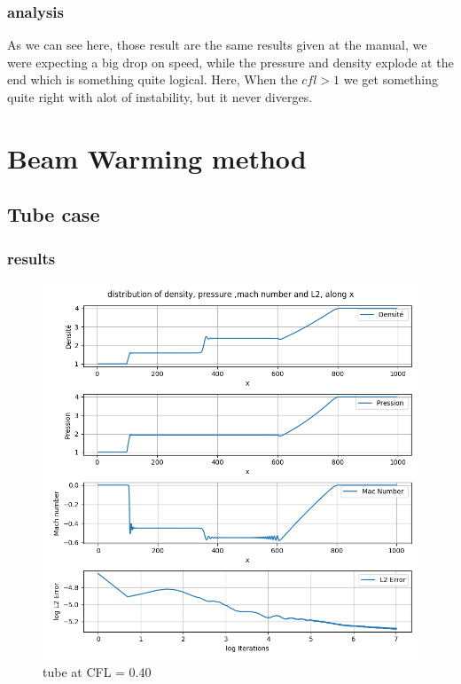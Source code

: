 \documentclass[12pt]{article}
\begin{document}
\subsubsection{analysis}
As we can see here, those result are the same results given at the manual, we were expecting a big drop on speed, while the pressure and density explode at the end
which is something quite logical. Here, When the $cfl>1$ we get something quite right with alot of instability, but it never diverges. 

\section{Beam Warming method}

\subsection{Tube case}

\subsubsection{results}

\begin{figure}[H] %
    \centering
    \includegraphics[width=\textwidth,height=\textheight,keepaspectratio]{PLOTS/Tube_Beam_CFL040.png}
    \caption{tube at CFL = 0.40}
    \label{fig:your_label}
\end{figure}
\end{document}
